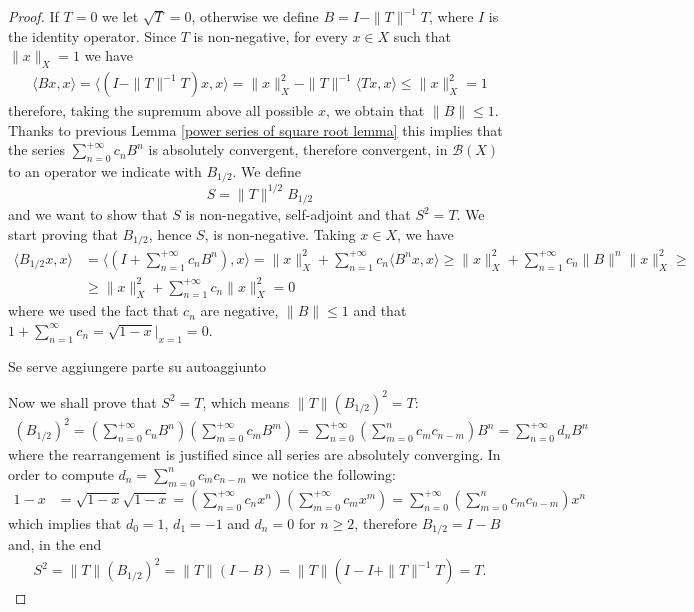 \documentclass[corpo=11pt, stile=classica, tipotesi=custom,
greek, evenboxes, english]{toptesi}
\numberwithin{equation}{chapter}
\theoremstyle{remark}
\newcommand{\B}{\mathscr{B}} %
\begin{document}
\begin{proof}
	If $T=0$ we let $\sqrt{T}=0$, otherwise we define $B = I - \|T\|^{-1}T$, where $I$ is the identity operator.
	Since $T$ is non-negative, for every $x \in X$ such that $\|x\|_X = 1$ we have
	\begin{align*}
		\langle Bx,x \rangle = \langle (I-\|T\|^{-1}T)x, x\rangle = \|x\|_X^2 - \|T\|^{-1}\langle Tx,x \rangle \leq \|x\|_X^2 = 1
	\end{align*}
	therefore, taking the supremum above all possible $x$, we obtain that $\|B\| \leq 1$. Thanks to previous Lemma \ref{power series of square root lemma} this implies that the series $\sum_{n=0}^{+\infty}c_n B^n$ is absolutely convergent, therefore convergent, in $\B(X)$ to an operator we indicate with $B_{1/2}$. We define
	\begin{equation}\label{square root of an operator}
		S = \|T\|^{1/2} B_{1/2}
	\end{equation}
	and we want to show that $S$ is non-negative, {\color{blue} self-adjoint} and that $S^2 = T$. We start proving that $B_{1/2}$, hence $S$, is non-negative. Taking $x \in X$, we have
	\begin{align*}
		\langle B_{1/2}x,x \rangle &= \langle (I + \sum_{n=1}^{+\infty} c_n B^n),x \rangle = \|x\|_X^2 + \sum_{n=1}^{+\infty} c_n\langle B^n x,x \rangle \geq \|x\|_X^2 + \sum_{n=1}^{+\infty} c_n \|B\|^n \|x\|_X^2 \geq\\
								   &\geq \|x\|_X^2 + \sum_{n=1}^{+\infty} c_n \|x\|_X^2 = 0
	\end{align*}
	where we used the fact that $c_n$ are negative, $\|B\| \leq 1$ and that $1 + \sum_{n=1}^{\infty}c_n = \sqrt{1-x}\rvert_{x=1} = 0$.
	
	{\color{blue} Se serve aggiungere parte su autoaggiunto}
	
	Now we shall prove that $S^2 = T$, which means $\|T\|(B_{1/2})^2 = T$:
	\begin{align*}
		(B_{1/2})^2 = \left(\sum_{n=0}^{+\infty}c_n B^n\right) \left(\sum_{m=0}^{+\infty}c_m B^m\right) = \sum_{n=0}^{+\infty} \left(\sum_{m=0}^{n} c_m c_{n-m}\right) B^n = \sum_{n=0}^{+\infty} d_n B^n
	\end{align*}
	where the rearrangement is justified since all series are absolutely converging. In order to compute $d_n = \sum_{m=0}^{n} c_m c_{n-m}$ we notice the following:
	\begin{align*}
			1-x &= \sqrt{1-x} \sqrt{1-x} = \left(\sum_{n=0}^{+\infty}c_n x^n\right) \left(\sum_{m=0}^{+\infty}c_m x^m\right) = \sum_{n=0}^{+\infty} \left(\sum_{m=0}^{n} c_m c_{n-m}\right) x^n 
	\end{align*}
	which implies that $d_0=1$, $d_1 = -1$ and $d_n = 0$ for $n \geq 2$, therefore $B_{1/2} = I - B$ and, in the end
	\begin{align*}
		S^2 = \|T\|(B_{1/2})^2 = \|T\|(I - B) = \|T\|(I - I + \|T\|^{-1}T) = T.
	\end{align*}
	


\end{proof}
\end{document}
